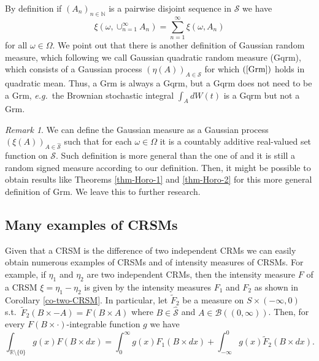 \documentclass{article}
\theoremstyle{plain}
\theoremstyle{remark}
\newtheorem{remark}[theorem]{Remark}
\begin{document}
By definition if $(A_n)_{n\in\mathbb{N}}$ is a pairwise disjoint sequence in $\mathcal{S}$ we have
\begin{equation}\label{Grm}
	\xi(\omega,\cup_{n=1}^\infty A_n)=\sum_{n=1}^{\infty}\xi(\omega,A_n)
\end{equation}
for all $\omega\in\Omega$. We point out that there is another definition of Gaussian random measure, which following \citet{Horo-Gauss} we call Gaussian quadratic random measure (Gqrm), which consists of a Gaussian process $(\eta(A))_{A\in\mathcal{S}}$ for which $(\ref{Grm})$ holds in quadratic mean. Thus, a Grm is always a Gqrm, but a Gqrm does not need to be a Grm, \textit{e.g.}~the Brownian stochastic integral $\int_{A} dW(t)$ is a Gqrm but not a Grm. 

\begin{remark}
	We can define the Gaussian measure as a Gaussian process $(\xi(A))_{A\in\hat{\mathcal{S}}}$ such that for each $\omega\in\Omega$ it is a countably additive real-valued set function on $\mathcal{S}$. Such definition is more general than the one of \citet{Horo-Gauss} and it is still a random signed measure according to our definition. Then, it might be possible to obtain results like Theorems \ref{thm-Horo-1} and \ref{thm-Horo-2} for this more general definition of Grm. We leave this to further research.
\end{remark}

\subsection{Many examples of CRSMs}
Given that a CRSM is the difference of two independent CRMs we can easily obtain numerous examples of CRSMs and of intensity measures of CRSMs. For example, if $\eta_1$ and $\eta_2$ are two independent CRMs, then the intensity measure $F$ of a CRSM $\xi=\eta_1-\eta_2$ is given by the intensity measures $F_1$ and $F_2$ as shown in Corollary \ref{co-two-CRSM}. In particular, let $\tilde{F}_2$ be a measure on $S\times(-\infty,0)$ s.t.~$\tilde{F}_2(B\times -A)=F(B\times A)$ where $B\in\hat{\mathcal{S}}$ and $A\in\mathcal{B}((0,\infty))$. Then, for every $F(B\times \cdot)$-integrable function $g$ we have
\begin{equation*}
	\int_{\mathbb{R}\setminus\{0\}}g(x)F(B\times dx)= 	\int_{0}^\infty g(x)F_1(B\times dx)+	\int_{-\infty}^0g(x)\tilde{F}_2(B\times dx).
\end{equation*}
\end{document}
